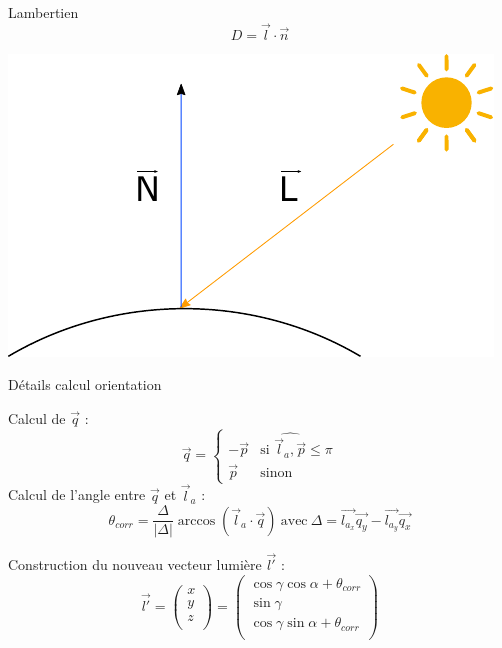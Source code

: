 \documentclass{beamer}
\begin{document}
\begin{frame}[noframenumbering]{Lambertien}
\begin{equation}
D = \vec{l}\cdot\vec{n}
\end{equation}

\begin{center}
\includegraphics[width=0.5\linewidth]{Schema/lambertien.pdf}
\end{center}
\end{frame}


\begin{frame}[noframenumbering]{Détails calcul orientation}


Calcul de $\vec{q}$ :
\begin{equation}
\label{equationReverseN}
\vec{q} = 
	\left\{
    \begin{array}{ll}
        -\vec{p} & \mbox{si } \widehat{\vec{l}_a,\vec{p}} \leq \pi\\
		\vec{p} & \mbox{sinon}				
    \end{array}
\right.
\end{equation}
Calcul de l'angle entre $\vec{q}$ et $\vec{l}_a$ :
\begin{equation}
\label{equationAngleOri}
 \theta_{corr} = \frac{\Delta}{|\Delta|} \arccos( \vec{l}_a \cdot{\vec{q}}) \ 
 \mathrm{avec} \  
\Delta =  \vec{l_{a_x}}\vec{q_y} - \vec{l_{a_y}}\vec{q_x}
\end{equation}

Construction du nouveau vecteur lumière $\vec{l'}$ :
\begin{equation}
\label{equationRotationMat}
\vec{l'} = 
\begin{pmatrix}
x \\
y \\
z \\
\end{pmatrix}
=
\begin{pmatrix}
\cos \gamma  \cos \alpha + \theta_{corr}\\
\sin \gamma \\
\cos \gamma  \sin \alpha + \theta_{corr} \\
\end{pmatrix}
\end{equation}

\end{frame}
\end{document}
